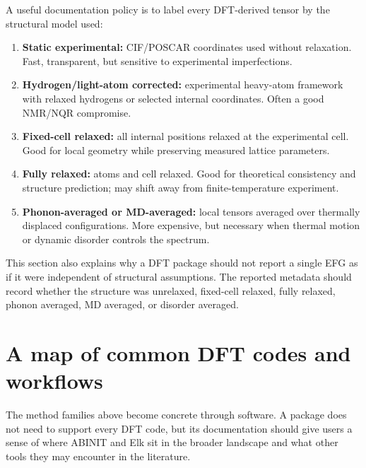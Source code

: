 \documentclass[11pt]{article}
\begin{document}
A useful documentation policy is to label every DFT-derived tensor by the structural model used:
\begin{enumerate}
\item \textbf{Static experimental:} CIF/POSCAR coordinates used without relaxation.  Fast, transparent, but sensitive to experimental imperfections.
\item \textbf{Hydrogen/light-atom corrected:} experimental heavy-atom framework with relaxed hydrogens or selected internal coordinates.  Often a good NMR/NQR compromise.
\item \textbf{Fixed-cell relaxed:} all internal positions relaxed at the experimental cell.  Good for local geometry while preserving measured lattice parameters.
\item \textbf{Fully relaxed:} atoms and cell relaxed.  Good for theoretical consistency and structure prediction; may shift away from finite-temperature experiment.
\item \textbf{Phonon-averaged or MD-averaged:} local tensors averaged over thermally displaced configurations.  More expensive, but necessary when thermal motion or dynamic disorder controls the spectrum.
\end{enumerate}

This section also explains why a DFT package should not report a single EFG as if it were independent of structural assumptions.  The reported metadata should record whether the structure was unrelaxed, fixed-cell relaxed, fully relaxed, phonon averaged, MD averaged, or disorder averaged.

\section{A map of common DFT codes and workflows}

The method families above become concrete through software.  A package does not need to support every DFT code, but its documentation should give users a sense of where ABINIT and Elk sit in the broader landscape and what other tools they may encounter in the literature.
\end{document}
